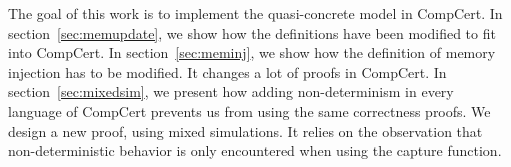 The goal of this work is to implement the quasi-concrete model in CompCert.
In section~\ref{sec:memupdate}, we show how the definitions have been modified to fit into CompCert.
In section~\ref{sec:meminj}, we show how the definition of memory injection has to be modified. It changes a lot of proofs in CompCert.
In section~\ref{sec:mixedsim}, we present how adding non-determinism in every language of CompCert prevents us from using the same correctness proofs. We design a new proof, using mixed simulations. It relies on the observation that non-deterministic behavior is only encountered when using the capture function.
